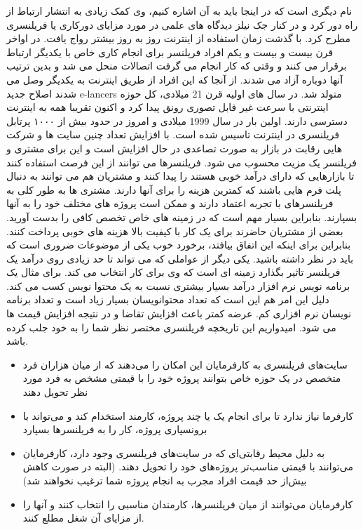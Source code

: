   نام دیگری است که در اینجا باید به آن اشاره کنیم، وی کمک زیادی به انتشار ارتباط از راه دور کرد و در کنار جک نیلز دیدگاه های علمی در مورد مزایای دورکاری یا فریلنسری مطرح کرد.
با گذشت زمان استفاده از اینترنت روز به روز بیشتر رواج یافت. در اواخر قرن بیست و بیست و یکم افراد فریلنسر برای انجام کاری خاص با یکدیگر ارتباط برقرار می کنند و وقتی که کار انجام می گرفت اتصالات منحل می شد و بدین ترتیب آنها دوباره آزاد می شدند. از آنجا که این افراد از طریق اینترنت به یکدیگر وصل می شدند اصلاح جدید e-lancers متولد شد. در سال های اولیه قرن 21 میلادی، کل حوزه اینترنتی با سرعت غیر قابل تصوری رونق پیدا کرد و اکنون تقریبا همه به اینترنت دسترسی دارند. اولین بار در سال 1999 میلادی و امروز در حدود بیش از ۱۰۰۰ پرتابل فریلنسری در اینترنت تاسیس شده است. با افزایش تعداد چنین سایت ها و شرکت هایی رقابت در بازار به صورت تصاعدی در حال افزایش است و این برای مشتری و فریلنسر یک مزیت محسوب می شود. فریلنسرها می توانند از این فرصت استفاده کنند تا بازارهایی که دارای درآمد خوبی هستند را پیدا کنند و مشتریان هم می توانند به دنبال پلت فرم هایی باشند که کمترین هزینه را برای آنها دارند.
مشتری ها به طور کلی به فریلنسرهای با تجربه اعتماد دارند و ممکن است پروژه های مختلف خود را به آنها بسپارند. بنابراین بسیار مهم است که در زمینه های خاص تخصص کافی را بدست آورید. بعضی از مشتریان حاضرند برای یک کار با کیفیت بالا هزینه های خوبی پرداخت کنند. بنابراین برای اینکه این اتفاق بیافتد، برخورد خوب یکی از موضوعات ضروری است که باید در نظر داشته باشید. یکی دیگر از عواملی که می تواند تا حد زیادی روی درآمد یک فریلنسر تاثیر بگذارد زمینه ای است که وی برای کار انتخاب می کند. برای مثال یک برنامه نویس نرم افزار درآمد بسیار بیشتری نسبت به یک محتوا نویس کسب می کند. دلیل این امر هم این است که تعداد محتوانویسان بسیار زیاد است و تعداد برنامه نویسان نرم افزاری کم. عرضه کمتر باعث افزایش تقاضا و در نتیجه افزایش قیمت ها می شود. امیدواریم این تاریخچه فریلنسری مختصر نظر شما را به خود جلب کرده باشد.
\begin{itemize}
	\item
	 سایت‌های فریلنسری به کارفرمایان این امکان را می‌دهند که از میان هزاران فرد متخصص در یک حوزه خاص بتوانند پروژه خود را با قیمتی مشخص به فرد مورد نظر تحویل دهند
	 \item
	کارفرما نیاز ندارد تا برای انجام یک یا چند پروژه، کارمند استخدام کند و می‌تواند با برونسپاری پروژه، کار را به فریلنسرها بسپارد
	\item
	به دلیل محیط رقابتی‌ای که در سایت‌های فریلنسری وجود دارد، کارفرمایان می‌توانند با قیمتی مناسب‌تر پروژه‌های خود را تحویل دهند. (البته در صورت کاهش بیش‌از حد قیمت افراد مجرب به انجام پروژه شما ترغیب نخواهند شد)
	\item
	کارفرمایان می‌توانند از میان فریلنسرها، کارمندان مناسبی را انتخاب کنند و آنها را از مزایای آن شغل مطلع کنند.
\end{itemize}

